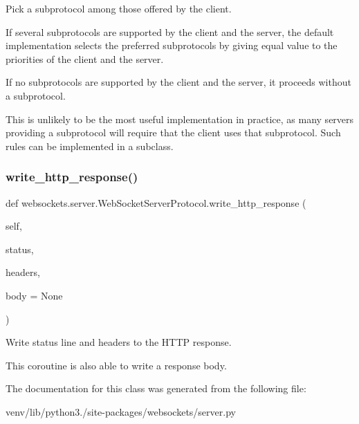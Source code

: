 \begin{DoxyVerb}Pick a subprotocol among those offered by the client.

If several subprotocols are supported by the client and the server,
the default implementation selects the preferred subprotocols by
giving equal value to the priorities of the client and the server.

If no subprotocols are supported by the client and the server, it
proceeds without a subprotocol.

This is unlikely to be the most useful implementation in practice, as
many servers providing a subprotocol will require that the client uses
that subprotocol. Such rules can be implemented in a subclass.\end{DoxyVerb}
 \mbox{\label{classwebsockets_1_1server_1_1_web_socket_server_protocol_ab2e016a048a0bfc7986db4926e991411}} 
\subsubsection{\texorpdfstring{write\+\_\+http\+\_\+response()}{write\_http\_response()}}
{\footnotesize\ttfamily def websockets.\+server.\+Web\+Socket\+Server\+Protocol.\+write\+\_\+http\+\_\+response (\begin{DoxyParamCaption}\item[{}]{self,  }\item[{}]{status,  }\item[{}]{headers,  }\item[{}]{body = {\ttfamily None} }\end{DoxyParamCaption})}

\begin{DoxyVerb}Write status line and headers to the HTTP response.

This coroutine is also able to write a response body.\end{DoxyVerb}
 

The documentation for this class was generated from the following file\+:\begin{DoxyCompactItemize}
\item 
venv/lib/python3./site-\/packages/websockets/server.\+py\end{DoxyCompactItemize}
